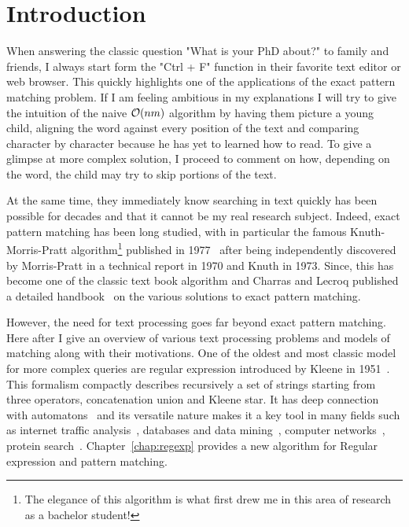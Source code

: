 \chapter*{Introduction}\label{chap:intro}

When answering the classic question "What is your PhD about?" to family and friends, I always start form the "Ctrl + F" function in their favorite text editor or web browser. This quickly highlights one of the applications of the exact pattern matching problem. If I am feeling ambitious in my explanations I will try to give the intuition of the naive $\mathcal{O}(nm)$ algorithm by having them picture a young child, aligning the word against every position of the text and comparing character by character because he has yet to learned how to read. To give a glimpse at more complex solution, I proceed to comment on how, depending on the word, the child may try to skip portions of the text.

At the same time, they immediately know searching in text quickly has been possible for decades and that it cannot be my real research subject. Indeed, exact pattern matching has been long studied, with in particular the famous Knuth-Morris-Pratt algorithm\footnote{The elegance of this algorithm is what first drew me in this area of research as a bachelor student!} published in 1977~\cite{KMP} after being independently discovered by Morris-Pratt in a technical report in 1970 and Knuth in 1973. Since, this has become one of the classic text book algorithm and Charras and Lecroq published a detailed handbook~\cite{charras2004handbook} on the various solutions to exact pattern matching.


However, the need for text processing goes far beyond exact pattern matching. Here after I give an overview of various text processing problems and models of matching along with their motivations.
One of the oldest and most classic model for more complex queries are regular expression introduced by Kleene in 1951~\cite{RM-704}.
This formalism compactly describes recursively a set of strings starting from three operators, concatenation union and Kleene star.
It has deep connection with automatons~\cite{Thompson_automaton} and its versatile nature makes it a key tool in many fields such as internet traffic analysis~\cite{4221791,4579527}, databases and data mining~\cite{1000341,10.5555/645927.672035,10.1145/375551.375569}, computer networks~\cite{10.1145/1159913.1159952}, protein search~\cite{10.1145/369133.369220}. Chapter~\ref{chap:regexp} provides a new algorithm for Regular expression and pattern matching.

